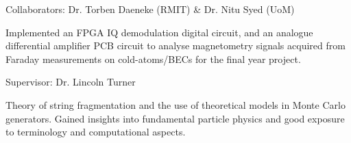 \documentclass[10pt,a4paper,ragged2e,withhyper]{altacv}
\begin{document}

		\vspace{1em}\faUsers\hspace{4pt} Collaborators: Dr. Torben Daeneke (RMIT) \& Dr. Nitu Syed (UoM)
			
		\divider
		
		\vspace{-0.2em}
		{\textalignment
		Implemented an FPGA IQ demodulation digital circuit, and an analogue differential amplifier PCB circuit to analyse magnetometry signals acquired from Faraday measurements on cold-atoms/BECs for the final year project.}
		
		\vspace{1em}\faUsers\hspace{4pt} Supervisor: Dr. Lincoln Turner
		
		\divider
		
		\vspace{-0.2em}
		{\textalignment Theory of string fragmentation and the use of theoretical models in Monte Carlo generators. Gained insights into fundamental particle physics and good exposure to terminology and computational aspects.}
		
\end{document}
